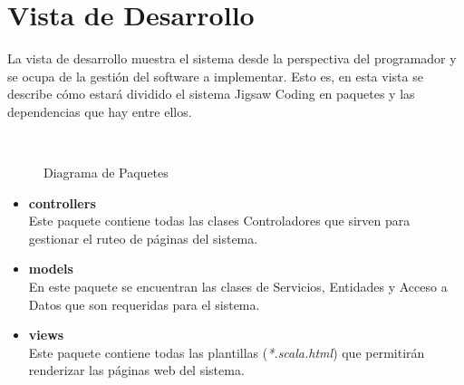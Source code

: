 \section{Vista de Desarrollo}
La vista de desarrollo muestra el sistema desde la perspectiva del programador y se ocupa de la gestión del software a implementar. Esto es, en esta vista se describe cómo estará dividido el sistema Jigsaw Coding en paquetes y las dependencias que hay entre ellos.
\begin{figure}[!h]
  \centering
  \\
  \caption{Diagrama de Paquetes}\label{fig:diagrama_de_paquetes}
\end{figure}
\begin{itemize}
  \item \textbf{controllers}\\Este paquete contiene todas las clases Controladores que sirven para gestionar el ruteo de páginas del sistema.
  \item \textbf{models}\\En este paquete se encuentran las clases de Servicios, Entidades y Acceso a Datos que son requeridas para el sistema.
  \item \textbf{views}\\Este paquete contiene todas las plantillas (\emph{*.scala.html}) que permitirán renderizar las páginas web del sistema.
\end{itemize}
\clearpage
